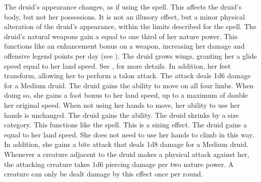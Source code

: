         The druid's appearance changes, as if using the  spell.
        This affects the druid's body, but not her possessions.
        It is not an illusory effect, but a minor physical alteration of the druid's appearance, within the limits described for the spell.
        The druid's natural weapons gain a  equal to one third of her nature power.
        This functions like an enhancement bonus on a weapon, increasing her damage and offensive legend points per day (see ).
        The druid grows wings, granting her a glide speed equal to her land speed.
        See , for more details.
        In addition, her feet transform, allowing her to perform a talon attack.
        The attack deals 1d6 damage for a Medium druid.
        The druid gains the ability to move on all four limbs.
        When doing so, she gains a  foot bonus to her land speed, up to a maximum of double her original speed.
        When not using her hands to move, her ability to use her hands is unchanged.
        The druid gains the  ability.
        The druid shrinks by a size category.
        This functions like the  spell.
        This is a sizing effect.
        The druid gains a  equal to her land speed.
        She does not need to use her hands to climb in this way.
        In addition, she gains a bite attack that deals 1d8 damage for a Medium druid.
        Whenever a creature adjacent to the druid makes a physical attack against her, the attacking creature takes 1d6 piercing damage per two nature power.
        A creature can only be dealt damage by this effect once per round.

